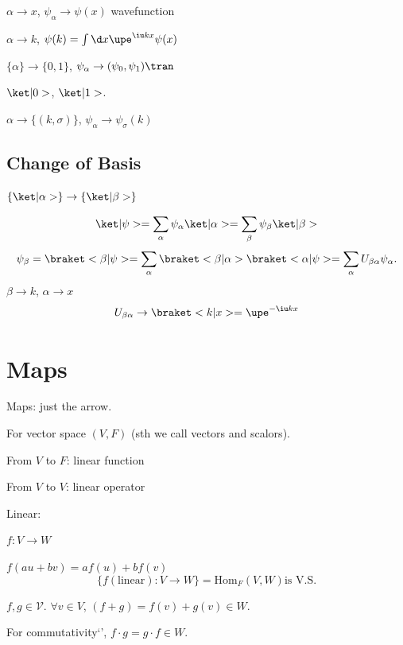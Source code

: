\begin{example}
  $\alpha \to x$, $\psi_\alpha \to \psi(x)$ wavefunction

  $\alpha \to k$, $\psi(k) = \int \d x \upe^{\iu kx} \psi(x)$

  $\{\alpha\} \to \{0,1\}$, $\psi_\alpha \to (\psi_0, \psi_1)\tran$

  $\ket|0>$, $\ket|1>$.

  $\alpha \to \{(k,\sigma)\}$, $\psi_\alpha \to \psi_\sigma (k)$
\end{example}


\subsection{Change of Basis}

$\{\ket|\alpha>\} \to \{\ket|\beta>\}$

\[
  \ket|\psi> = \sum_\alpha \psi_\alpha \ket|\alpha> = \sum_\beta \psi_\beta \ket|\beta>
\]
\[
  \psi_\beta = \braket<\beta|\psi> = \sum_\alpha \braket<\beta|\alpha>\braket<\alpha|\psi> = \sum_\alpha U_{\beta\alpha} \psi_\alpha.
\]
$\beta \to k$, $\alpha \to x$
\[U_{\beta\alpha} \to \braket<k|x> = \upe^{-\iu kx}\]

\section{Maps}

Maps: just the arrow.

For vector space $(V,F)$ (sth we call vectors and scalors).



From $V$ to $F$: linear function

From $V$ to $V$: linear operator

Linear:

$f: V \to W$

$f(au + bv) = af(u) + bf(v)$
\[
  \{f(\text{linear}):V \to W\} = \text{Hom}_F (V,W) \text{is V.S.}
\]

$f, g \in \mathcal V$. $\forall v \in V$, $(f + g) = f(v) + g(v) \in W$.

For commutativity`', $f \cdot g = g \cdot f \in W$.

